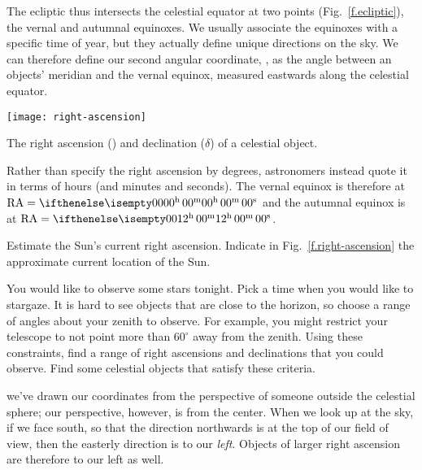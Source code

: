 The ecliptic thus intersects the celestial equator at two points (Fig.~\ref{f.ecliptic}), the vernal and autumnal equinoxes. We usually associate the equinoxes with a specific time of year, but they actually define unique directions on the sky. We can therefore define our second angular coordinate, , as the angle between an objects' meridian and the vernal equinox, measured eastwards along the celestial equator.

\begin{marginfigure}
\texttt{[image: right-ascension]}
\caption[Right ascension and declination]{The right ascension (\RA) and declination ($\delta$) of a celestial object.}
\label{f.right-ascension}
\end{marginfigure}

Rather than specify the right ascension by degrees, astronomers instead quote it in terms of hours (and minutes and seconds).  The vernal equinox is therefore at $\RA = \hrangle{00}{00}{00}$ and the autumnal equinox is at $\RA = \hrangle{12}{00}{00}$.

\begin{exercisebox}
Estimate the Sun's current right ascension. Indicate in Fig.~\ref{f.right-ascension} the approximate current location of the Sun.
\label{ex.RA-sun}
\end{exercisebox}

\begin{exercisebox}
You would like to observe some stars tonight. Pick a time when you would like to stargaze.
It is hard to see objects that are close to the horizon, so choose a range of angles about your zenith to observe.  For example, you might restrict your telescope to not point more than $60^{\circ}$ away from the zenith. Using these constraints, find a range of right ascensions and declinations that you could observe. Find some celestial objects that satisfy these criteria.
\end{exercisebox}

 we've drawn our coordinates from the perspective of someone outside the celestial sphere; our perspective, however, is from the center.  When we look up at the sky, if we face south, so that the direction northwards is at the top of our field of view, then the easterly direction is to our \emph{left}. Objects of larger right ascension are therefore to our left as well.

